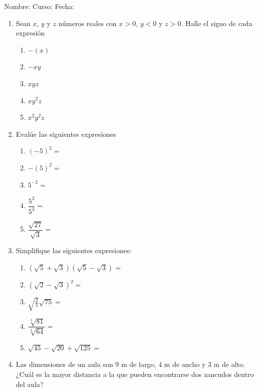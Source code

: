 \documentclass[fleqn,twocolumn,landscape]{article}
\newcommand{\LineaNombre}{%
\par
\vspace{\baselineskip}
Nombre:\hrulefill \; Curso: \underline{\hspace*{48pt}} \; Fecha: \underline{\hspace*{2.5cm}} \relax
\par}
\begin{document}
\LineaNombre
\begin{enumerate}
 \item Sean $x$, $y$ y $z$ números reales con $x>0$, $y<0$ y $z>0$. Halle el signo de cada expresión
 \begin{enumerate}
 \item $-(x)$
 \item $-xy$
 \item $xyz$
 \item $xy^{2}z$
 \item $x^{2}y^{2}z$
 \end{enumerate}
 \item Evalúe las siguientes expresiones
 \begin{enumerate}
 \item $(-5)^{2}=$\noanswer
 \item $-(5)^{2}=$\noanswer
 \item $5^{-2}=$\noanswer
 \item $\dfrac{5^{2}}{5^{3}}=$\noanswer
 \item $\dfrac{\sqrt{27}}{\sqrt{3}}=$\noanswer
 \end{enumerate}
 \item Simplifique las siguientes expresiones:
 \begin{enumerate}
 \item $(\sqrt{5}+\sqrt{3})(\sqrt{5}-\sqrt{3})=$\vspace*{20pt}
 \item $(\sqrt{2}-\sqrt{3})^{2}=$\vspace*{20pt}
 \item $\sqrt{\frac{2}{3}}\sqrt{75}=$ \vspace*{20pt}
 \item $\dfrac{\sqrt[3]{81}}{\sqrt[3]{64}}=$\vspace*{20pt}
  \item $\sqrt{45}-\sqrt{20}+\sqrt{125}=$\vspace*{20pt}
 \end{enumerate}
 \item Las dimensiones de un aula son 9 m de largo, 4 m de ancho y 3 m de alto. ¿Cuál es la mayor distancia a la que pueden encontrarse dos zancudos dentro del aula?\noanswer

\end{enumerate}
\end{document}

